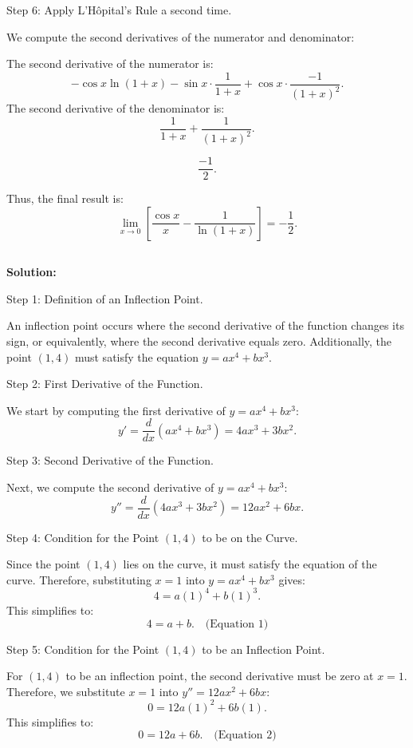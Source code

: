 \documentclass{article}
\begin{document}
Step 6: Apply L'Hôpital's Rule a second time.

We compute the second derivatives of the numerator and denominator:

The second derivative of the numerator is:
\[
-\cos x \ln(1+x) - \sin x \cdot \frac{1}{1+x} + \cos x \cdot \frac{-1}{(1+x)^2}.
\]
The second derivative of the denominator is:
\[
\frac{1}{1+x} + \frac{1}{(1+x)^2}.
\]





\[
\frac{-1}{2}.
\]

Thus, the final result is:
\[
\lim_{x \to 0} \left[\frac{\cos x}{x} - \frac{1}{\ln(1+x)}\right] = -\frac{1}{2}.
\]


\subsection{}	
\textbf{Solution:}

Step 1: Definition of an Inflection Point.

An inflection point occurs where the second derivative of the function changes its sign, or equivalently, where the second derivative equals zero. Additionally, the point \( (1, 4) \) must satisfy the equation \( y = ax^4 + bx^3 \).

Step 2: First Derivative of the Function.

We start by computing the first derivative of \( y = ax^4 + bx^3 \):
\[
y' = \frac{d}{dx}(ax^4 + bx^3) = 4ax^3 + 3bx^2.
\]

Step 3: Second Derivative of the Function.

Next, we compute the second derivative of \( y = ax^4 + bx^3 \):
\[
y'' = \frac{d}{dx}(4ax^3 + 3bx^2) = 12ax^2 + 6bx.
\]

Step 4: Condition for the Point \( (1, 4) \) to be on the Curve.

Since the point \( (1, 4) \) lies on the curve, it must satisfy the equation of the curve. Therefore, substituting \( x = 1 \) into \( y = ax^4 + bx^3 \) gives:
\[
4 = a(1)^4 + b(1)^3.
\]
This simplifies to:
\[
4 = a + b. \quad \text{(Equation 1)}
\]

Step 5: Condition for the Point \( (1, 4) \) to be an Inflection Point.

For \( (1, 4) \) to be an inflection point, the second derivative must be zero at \( x = 1 \). Therefore, we substitute \( x = 1 \) into \( y'' = 12ax^2 + 6bx \):
\[
0 = 12a(1)^2 + 6b(1).
\]
This simplifies to:
\[
0 = 12a + 6b. \quad \text{(Equation 2)}
\]
\end{document}
